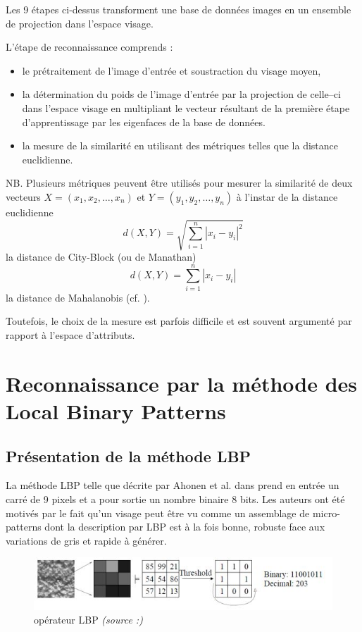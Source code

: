 Les 9 étapes ci-dessus transforment une base de données images en un ensemble de projection dans l'espace visage.

L'étape de reconnaissance comprends : 
\begin{itemize}
	\item [\textbullet] le prétraitement de l'image d'entrée et soustraction du visage moyen,
	\item [\textbullet] la détermination du poids de l'image d'entrée par la projection de celle–ci dans l'espace 
visage en multipliant le vecteur résultant de la première étape d'apprentissage par les eigenfaces de la base de données.
  \item [\textbullet]la mesure de la similarité  en  utilisant  des  métriques  telles  que  la  distance euclidienne.
	\end{itemize}
	
	NB. Plusieurs métriques peuvent être utilisés pour mesurer la similarité de deux vecteurs $X=(x_1,x_2,\ldots,x_n)$ et $Y=(y_1,y_2,\ldots,y_n)$ à l'instar de la distance euclidienne $$d(X,Y)=\sqrt{\sum_{i=1}^{n}{\left|x_i-y_i\right|^2}}$$ la distance de City-Block (ou de Manathan) $$d(X,Y)=\sum_{i=1}^{n}{\left|x_i-y_i\right|}$$ la distance de Mahalanobis (cf. \cite{KATO}).
	
	Toutefois, le choix de la mesure est parfois difficile et est souvent argumenté par rapport à l'espace d'attributs.
	
\section{Reconnaissance par la méthode des Local Binary Patterns} 
\subsection{Présentation de la méthode LBP}
La méthode LBP telle que décrite par Ahonen et al. dans \cite{TIM} prend en entrée un carré de  9 pixels et a pour sortie un nombre binaire 8 bits. Les auteurs ont été motivés par le fait qu'un visage peut être vu comme un assemblage de micro-patterns dont la description par LBP est à la fois bonne, robuste face aux variations de gris et rapide à générer. 

\begin{figure}[htbp]
	\centering
		\includegraphics{BLP.JPG}
	\caption[opérateur LBP ]{opérateur LBP \textit{(source :\cite{TIM})}}
	\label{fig:LBP}
\end{figure}

